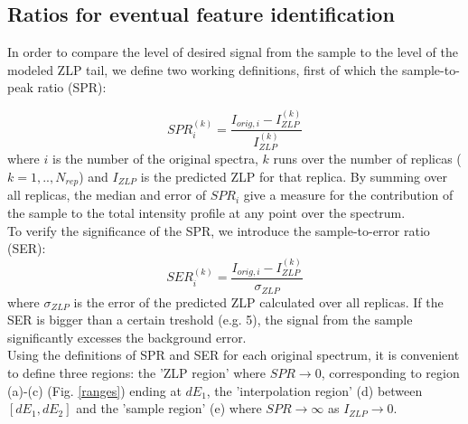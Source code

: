 \subsection{Ratios for eventual feature identification}

In order to compare the level of desired signal from the sample to the level of the modeled ZLP tail, we define two working definitions, first of which the sample-to-peak ratio (SPR):

\begin{equation}
    SPR_{i}^{(k)} = \frac{I_{orig, i} - I_{ZLP}^{(k)}}{I_{ZLP}^{(k)}}
\end{equation}
where $i$ is the number of the original spectra, $k$ runs over the number of replicas ($k=1,..,N_{rep}$) and $I_{ZLP}$ is the predicted ZLP for that replica. By summing over all replicas, the median and error of $SPR_i$ give a measure for the contribution of the sample to the total intensity profile at any point over the spectrum. \\

To verify the significance of the SPR, we introduce the sample-to-error ratio (SER):
\begin{equation}
    SER_{i}^{(k)} = \frac{I_{orig, i} - I_{ZLP}^{(k)}}{\sigma_{ZLP}}
\end{equation}
where $\sigma_{ZLP}$ is the error of the predicted ZLP calculated over all replicas. 
If the SER is bigger than a certain treshold (e.g. 5), the signal from the sample significantly excesses the background error. \\
Using the definitions of SPR and SER for each original spectrum, it is convenient to define three regions: the 'ZLP region' where $SPR \rightarrow0$, corresponding to region (a)-(c) (Fig. \ref{ranges}) ending at $dE_1$, the 'interpolation region' (d) between $[dE_1, dE_2]$ and the 'sample region' (e) where $SPR\rightarrow\infty$ as $I_{ZLP}\rightarrow0$.